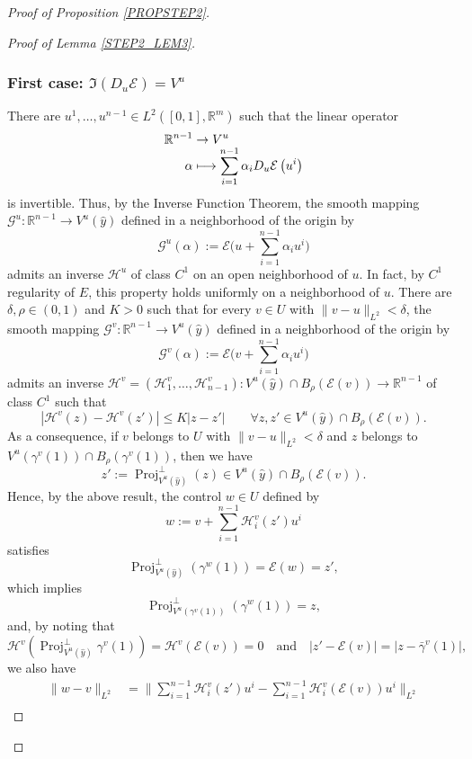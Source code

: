 \documentclass[JEP,XML,SOM,Unicode,NoFloatCountersInSection,published]{cedram}
\newcommand\mto{\mathchoice{\longmapsto}{\mapsto}{\mapsto}{\mapsto}}
\DeclareMathOperator{\Proj}{Proj}
\newcommand\R{\mathbb R}
\theoremstyle{definition}
\begin{document}
\begin{proof}[Proof of Proposition \ref{PROPSTEP2}]
\begin{proof}[Proof of Lemma \ref{STEP2_LEM3}]
\subsubsection*{First case: $ \Im (D_{u} \mathcal{E})=V^{u}$}
There are $u^1, \ldots, u^{n-1} \in L^2([0,1],\R^m)$ such that the linear operator
\begin{align*}
\R^{n-1} & \to V^{u} \\[-5pt]
\alpha & \mto \sum_{i=1}^{n-1} \alpha_i D_u\mathcal{E} \left(u^{i}\right)
\end{align*}
is invertible. Thus, by the Inverse Function Theorem, the smooth mapping $\mathcal{G}^u: \R^{n-1} \to V^{u}(\hat{y})$ defined in a neighborhood of the origin by
\[
\mathcal{G}^u (\alpha) := \mathcal{E} \biggl(u + \sum_{i=1}^{n-1} \alpha_i u^{i}\biggr)
\]
admits an inverse $\mathcal{H}^u$ of class $C^1$ on an open neighborhood of $u$. In fact, by $C^1$ regularity of $E$, this property holds uniformly on a neighborhood of $u$. There are $\delta, \rho \in (0,1)$ and $K>0$ such that for every $v\in U$ with $\|v-u\|_{L^2}< \delta$, the smooth mapping $\mathcal{G}^v: \R^{n-1} \to V^{u}(\hat{y})$ defined in a neighborhood of the origin by
\[
\mathcal{G}^v (\alpha) := \mathcal{E} \biggl(v + \sum_{i=1}^{n-1} \alpha_i u^{i}\biggr)
\]
admits an inverse $\mathcal{H}^v=(\mathcal{H}^v_1,\ldots, \mathcal{H}^v_{n-1}): V^u(\hat{y}) \cap B_{\rho}(\mathcal{E}(v)) \to \R^{n-1}$ of class $C^1$ such that
\[
\left| \mathcal{H}^v(z)-\mathcal{H}^v(z') \right| \leq K |z-z'| \qquad \forall z,z' \in V^u(\hat{y}) \cap B_{\rho}(\mathcal{E}(v)).
\]
As a consequence, if $v$ belongs to $U$ with $\|v-u\|_{L^2} < \delta$ and $z$ belongs to $V^{u}(\gamma^v(1)) \cap B_{\rho}(\gamma^v(1))$, then we have
\[
z' := \Proj_{V^{u}(\hat{y})}^{\perp} (z) \in V^u(\hat{y}) \cap B_{\rho}(\mathcal{E}(v)).
\]
Hence, by the above result, the control $w\in U$ defined by
\begin{equation}\label{20janv1}
w:=v + \sum_{i=1}^{n-1} \mathcal{H}_i^v(z') u^{i}
\end{equation}
satisfies
\[
\Proj_{V^u(\hat{y})}^{\perp} \left(\gamma^w(1)\right)= \mathcal{E}(w) =z',
\]
which implies
\[
\Proj_{V^u(\gamma^v(1))}^{\perp} \left(\gamma^w(1)\right)= z,
\]
and, by noting that
\[
\mathcal{H}^v(\Proj_{V^u(\hat{y})}^{\perp}\gamma^v(1))= \mathcal{H}^v(\mathcal{E}(v))=0 \quad \text{and} \quad \left|z'-\mathcal{E}(v)\right| = | z-\bar{\gamma}^v(1)|,
\]
we also have
\begin{align*}
\|w-v\|_{L^2} & = \biggl\| \sum_{i=1}^{n-1} \mathcal{H}_i^v(z') u^{i} - \sum_{i=1}^{n-1} \mathcal{H}^v_i(\mathcal{E}(v)) u^i\biggr\|_{L^2} \\

\end{align*}
\end{proof}
\end{proof}
\end{document}
